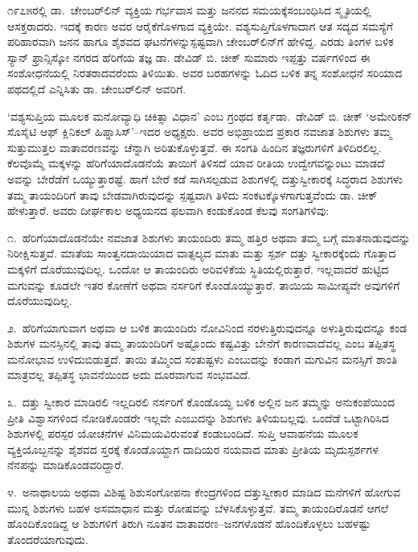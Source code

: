 ೧೯೭೫ರಲ್ಲಿ ಡಾ.\ ಚೇಂಬರ್​ಲಿನ್ ವ್ಯಕ್ತಿಯ ಗರ್ಭವಾಸ ಮತ್ತು ಜನನದ ಸಮಯಕ್ಕೆ\break ಸಂಬಂಧಿಸಿದ ಸ್ಮೃತಿಯಲ್ಲಿ ಆಸಕ್ತರಾದರು. ಇದಕ್ಕೆ ಕಾರಣ ಅವರ ಆರೈಕೆಗೊಳಗಾದ ವ್ಯಕ್ತಿಯೇ. ವಶ್ಯಸುಪ್ತಿಗೊಳಗಾದಾಗ ಆತ ಸದ್ಯದ ಸಮಸ್ಯೆಗೆ ಪರಿಹಾರವಾಗಿ ಜನನ ಹಾಗೂ ಶೈಶವದ ಘಟನೆಗಳನ್ನು\break ಸ್ಪಷ್ಟವಾಗಿ ಚೇಂಬರ್​ಲಿನ್​ಗೆ ಹೇಳಿದ್ದ. ಎರಡು ತಿಂಗಳ ಬಳಿಕ ಸ್ಯಾನ್ ಫ್ರಾನ್ಸಿಸ್ಕೋ ನಗರದ ಹೆರಿಗೆಯ ತಜ್ಞ ಡಾ. ಡೇವಿಡ್ ಬಿ. ಚೀಕ್ ಸುಮಾರು ಇಪ್ಪತ್ತು ವರ್ಷಗಳಿಂದ ಈ ಸಂಶೋಧನೆಯಲ್ಲಿ ನಿರತರಾದವರೆಂದು ತಿಳಿಯಿತು. ಅವರ ಬರಹಗಳನ್ನು ಓದಿದ ಬಳಿಕ ತನ್ನ ಸಂಶೋಧನೆ ಸರಿಯಾದ ಪಥದಲ್ಲಿದೆ ಎನ್ನಿಸಿತು ಡಾ. ಚೇಂಬರ್​ಲಿನ್ ಅವರಿಗೆ.

‘ವಶ್ಯಸುಪ್ತಿಯ ಮೂಲಕ ಮನೋವ್ಯಾಧಿ ಚಿಕಿತ್ಸಾ ವಿಧಾನ’ ಎಂಬ ಗ್ರಂಥದ ಕರ್ತೃ\break ಡಾ.\ ಡೇವಿಡ್ ಬಿ. ಚೀಕ್ ‘ಅಮೇರಿಕನ್ ಸೊಸೈಟಿ ಆಫ್ ಕ್ಲಿನಿಕಲ್ ಹಿಪ್ನಾಸಿಸ್​’–ಇದರ ಅಧ್ಯಕ್ಷರು. ಅವರ ಅಭಿಪ್ರಾಯದ ಪ್ರಕಾರ ನವಜಾತ ಶಿಶುಗಳು ತಮ್ಮ ಸುತ್ತುಮುತ್ತಲ ವಾತಾವರಣವನ್ನು ಚೆನ್ನಾಗಿ ಅರಿತುಕೊಳ್ಳುತ್ತವೆ. ಈ ಸಂಗತಿ ಹಿಂದಿನ ತಜ್ಞರುಗಳಿಗೆ ತಿಳಿದಿರಲಿಲ್ಲ. ಕೆಲವೊಮ್ಮೆ ಮಕ್ಕಳನ್ನು ಹೆರಿಗೆಯಾದೊಡನೆಯೆ ತಾಯಿಗೆ ತಿಳಿಸದೆ ಯಾವ ರೀತಿಯ ಉದ್ವೇಗವನ್ನುಂಟು ಮಾಡದೆ ಅವನ್ನು ಬೇರೆಡೆಗೆ ಒಯ್ಯುತ್ತಾರಷ್ಟೆ. ಹಾಗೆ ಬೇರೆ ಕಡೆ ಸಾಗಿಸಲ್ಪಡುವ ಶಿಶುಗಳಲ್ಲಿ ದತ್ತುಸ್ವೀಕಾರಕ್ಕೆ ಸಿದ್ಧರಾದ ಶಿಶುಗಳು ತಮ್ಮ ತಾಯಂದಿರಿಗೆ ತಾವು ಬೇಡವಾಗಿರುವುದನ್ನು ಸ್ಪಷ್ಟವಾಗಿ ತಿಳಿದು ಸಂಕಟಕ್ಕೊಳಗಾಗುತ್ತವೆಂದು ಡಾ. ಚೀಕ್ ಹೇಳುತ್ತಾರೆ. ಅವರು ದೀರ್ಘಕಾಲ ಅಧ್ಯಯನದ ಫಲವಾಗಿ ಕಂಡುಕೊಂಡ ಕೆಲವು ಸಂಗತಿಗಳಿವು:

೧.\ ಹೆರಿಗೆಯಾದೊಡನೆಯೇ ನವಜಾತ ಶಿಶುಗಳು ತಾಯಂದಿರು ತಮ್ಮ ಹತ್ತಿರ ಅಥವಾ ತಮ್ಮ ಬಗ್ಗೆ ಮಾತನಾಡುವುದನ್ನು ನಿರೀಕ್ಷಿಸುತ್ತವೆ. ಮಾತೆಯ ಸಾಂತ್ವನದಾಯಿಯಾದ ವಾತ್ಸಲ್ಯದ ಮಾತು ಮತ್ತು ಸ್ಪರ್ಶ ದತ್ತು ಸ್ವೀಕಾರಕ್ಕೆಂದು ಗೊತ್ತಾದ ಮಕ್ಕಳಿಗೆ ದೊರೆಯುವುದಿಲ್ಲ. ಒಂದೋ ಆ ತಾಯಂದಿರು ಅರಿವಳಿಕೆಯ ಸ್ಥಿತಿಯಲ್ಲಿರುತ್ತಾರೆ. ಇಲ್ಲವಾದರೆ ಹುಟ್ಟಿದ ಮಗುವನ್ನು ಕೂಡಲೇ ಇತರ ಕೋಣೆಗೆ ಅಥವಾ ನರ್ಸರಿಗೆ ಕೊಂಡೊಯ್ಯುತ್ತಾರೆ. ತಾಯಿಯ ಸಾಮೀಪ್ಯವೇ ಅವುಗಳಿಗೆ ದೊರೆಯುವುದಿಲ್ಲ.

೨.\ ಹೆರಿಗೆಯಾಗುವಾಗ ಅಥವಾ ಆ ಬಳಿಕ ತಾಯಂದಿರು ನೋವಿನಿಂದ ನರಳು\-ತ್ತಿರು\-ವುದನ್ನೂ ಅಳುತ್ತಿರುವುದನ್ನೂ ಕಂಡ ಶಿಶುಗಳ ಮನಸ್ಸಿನಲ್ಲಿ ತಾವು ತಮ್ಮ ತಾಯಂದಿರಿಗೆ ಅಷ್ಟೊಂದು ಕಷ್ಟವಿತ್ತು ಬೇನೆಗೆ ಕಾರಣವಾದೆವಲ್ಲ ಎಂಬ ತಪ್ಪಿತಸ್ಥ ಮನೋಭಾವ ಉಳಿದುಬಿಡುತ್ತದೆ. ತಾಯಿ ತಮ್ಮಿಂದ ಸಂತುಷ್ಟಳು ಎಂಬುದನ್ನು ಕಂಡಾಗ ಮಗುವಿನ ಮನಸ್ಸಿಗೆ ಶಾಂತಿ ಮಾತ್ರವಲ್ಲ ತಪ್ಪಿತಸ್ಥ ಭಾವನೆಯಿಂದ ಅದು ದೂರವಾಗುವ ಸಂಭವವಿದೆ.

೩.\ ದತ್ತು ಸ್ವೀಕಾರ ಮಾಡಿರಲಿ ಇಲ್ಲದಿರಲಿ ನರ್ಸರಿಗೆ ಕೊಂಡೊಯ್ದ ಬಳಿಕ ಅಲ್ಲಿನ ಜನ ತಮ್ಮನ್ನು ಅನುಕಂಪೆಯಿಂದ ಪ್ರೀತಿ ವಿಶ್ವಾಸಗಳಿಂದ ನೋಡಿಕೊಂಡರೇ ಇಲ್ಲವೇ ಎಂಬುದನ್ನು ಶಿಶುಗಳು ತಿಳಿಯಬಲ್ಲವು. ಒಂದೆಡೆ ಒಟ್ಟಾಗಿರಿಸಿದ ಶಿಶುಗಳಲ್ಲಿ ಪರಸ್ಪರ ಯೋಚನೆಗಳ ವಿನಿಮಯ\-ವಿರುವಂತೆ ಕಂಡುಬಂದಿದೆ. ಸುಪ್ತಿ ಆವಾಹನೆಯ ಮೂಲಕ ವ್ಯಕ್ತಿಯೊಬ್ಬನನ್ನು ಶೈಶವದ ಸ್ತರಕ್ಕೆ ಕೊಂಡೊಯ್ದಾಗ ದಾದಿಯರ ನಯವಾದ ಮಾತು ಪ್ರೀತಿಯ ಮೃದುಸ್ಪರ್ಶಗಳ ನೆನಪನ್ನು ಮಾಡಿ\-ಕೊಂಡವರಿದ್ದಾರೆ.

೪.\ ಅನಾಥಾಲಯ ಅಥವಾ ವಿಶಿಷ್ಟ ಶಿಶುಸಂಗೋಪನಾ ಕೇಂದ್ರಗಳಿಂದ ದತ್ತುಸ್ವೀಕಾರ ಮಾಡಿದ ಮನೆಗಳಿಗೆ ಹೋಗುವ ಮುನ್ನ ಶಿಶುಗಳು ಬಹಳ ಅಸಮಾಧಾನ ಮತ್ತು ರೋಷವನ್ನು ಬೆಳಸಿಕೊಳ್ಳುತ್ತವೆ. ತಮ್ಮ ತಾಯಂದಿರೊಡನೆ ಆಗಲೆ ಹೊಂದಿಕೊಂಡಿದ್ದ ಆ ಶಿಶುಗಳಿಗೆ ತಿರುಗಿ ನೂತನ ವಾತಾವರಣ–ಜನಗಳೊಡನೆ ಹೊಂದಿಕೊಳ್ಳಲು ಬಹಳಷ್ಟು ತೊಂದರೆಯಾಗುವುದು.


